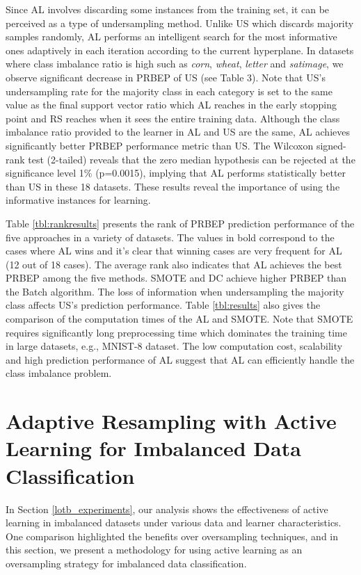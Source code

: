 Since AL involves discarding some instances from the training set, it can be perceived as a type of undersampling method. Unlike US which discards majority samples randomly, AL performs an intelligent search for the most informative ones adaptively in each iteration according to the current hyperplane. In datasets where class imbalance ratio is high such as \emph{corn}, \emph{wheat}, \emph{letter} and \emph{satimage}, we observe significant decrease in PRBEP of US (see Table 3). Note that US's undersampling rate for the majority class in each category is set to the same value as the final support vector ratio which AL reaches in the early stopping point and RS reaches when it sees the entire training data. Although the class imbalance ratio provided to the learner in AL and US are the same, AL achieves significantly better PRBEP performance metric than US. The Wilcoxon signed-rank test (2-tailed) reveals that the zero median hypothesis can be rejected at the significance level 1\% (p=0.0015), implying that AL performs statistically better than US in these 18 datasets. These results reveal the importance of using the informative instances for learning.

Table \ref{tbl:rankresults} presents the rank of PRBEP prediction performance of the five approaches in a variety of datasets. The values in bold correspond to the cases where AL wins and it's clear that winning cases are very frequent for AL (12 out of 18 cases). The average rank also indicates that AL achieves the best PRBEP among the five methods. SMOTE and DC achieve higher PRBEP than the Batch algorithm. The loss of information when undersampling the majority class affects US's prediction performance. Table \ref{tbl:results} also gives the comparison of the computation times of the AL and SMOTE. Note that SMOTE requires significantly long preprocessing time which dominates the training time in large datasets, e.g., MNIST-8 dataset. The low computation cost, scalability and high prediction performance of AL suggest that AL can efficiently handle the class imbalance problem.




\section{Adaptive Resampling with Active Learning for Imbalanced Data Classification}
\label{virtual}
In Section \ref{lotb_experiments}, our analysis shows the effectiveness of active learning in imbalanced datasets under various data and learner characteristics. One comparison highlighted the benefits over oversampling techniques, and in this section, we present a methodology for using active learning as an oversampling strategy for imbalanced data classification.

